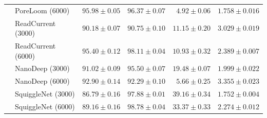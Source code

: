 \begin{tabular}{@{}llrrrr@{}}
 & PoreLoom (6000) & $95.98 \pm 0.05$ & $96.37 \pm 0.07$ & $4.92 \pm 0.06$ & $1.758 \pm 0.016$\\
 & ReadCurrent (3000) & $90.18 \pm 0.07$ & $90.75 \pm 0.10$ & $11.15 \pm 0.20$ & $3.029 \pm 0.019$\\
 & ReadCurrent (6000) & $95.40 \pm 0.12$ & $98.11 \pm 0.04$ & $10.93 \pm 0.32$ & $2.389 \pm 0.007$\\
 & NanoDeep (3000) & $91.02 \pm 0.09$ & $95.50 \pm 0.07$ & $19.48 \pm 0.07$ & $1.999 \pm 0.022$\\
 & NanoDeep (6000) & $92.90 \pm 0.14$ & $92.29 \pm 0.10$ & $5.66 \pm 0.25$ & $3.355 \pm 0.023$\\
 & SquiggleNet (3000) & $86.79 \pm 0.16$ & $97.88 \pm 0.01$ & $39.16 \pm 0.34$ & $1.752 \pm 0.004$\\
 & SquiggleNet (6000) & $89.16 \pm 0.16$ & $98.78 \pm 0.04$ & $33.37 \pm 0.33$ & $2.274 \pm 0.012$\\
\bottomrule
\end{tabular}

